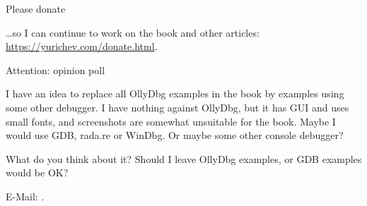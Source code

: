 \vspace*{\fill}

\huge Please donate
\normalsize

\bigskip
\bigskip
\bigskip

\dots so I can continue to work on the book and other articles: \\
\url{https://yurichev.com/donate.html}.

\bigskip
\bigskip
\bigskip

\huge Attention: opinion poll
\normalsize

\bigskip
\bigskip
\bigskip

I have an idea to replace all OllyDbg examples in the book by examples using some other debugger.
I have nothing against OllyDbg, but it has GUI and uses small fonts, and screenshots are somewhat unsuitable for the book.
Maybe I would use GDB, rada.re or WinDbg.
Or maybe some other console debugger?

What do you think about it?
Should I leave OllyDbg examples, or GDB examples would be OK?

E-Mail: \GTT{\EMAIL}.

\vspace*{\fill}
\vfill
